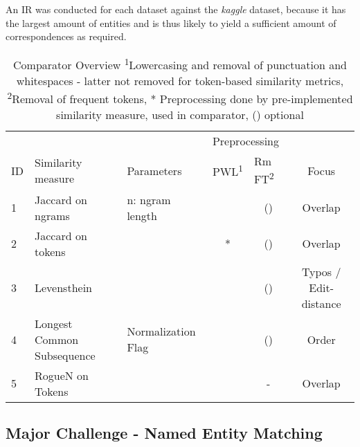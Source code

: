 \documentclass[11pt,titlepage,oneside,openany]{book}
\begin{document}
An IR was conducted for each dataset against the \textit{kaggle} dataset, because it has the largest amount of entities and is thus likely to yield a sufficient amount of correspondences as required.


\begin{table}[b]
	
	
	\begin{tabular}{lllccc}
		& \multicolumn{2}{l}{}                              & \multicolumn{2}{l}{Preprocessing}                   & \\
		ID & Similarity   measure       & Parameters           & \multicolumn{1}{l}{PWL\textsuperscript{1}} & \multicolumn{1}{l}{Rm FT\textsuperscript{2}} & Focus\\
		1  & Jaccard on ngrams          & n: ngram   length    & \checked & (\checked)                     & Overlap\\
		2  & Jaccard on tokens          &                      & *                       & (\checked)                       &Overlap\\
		3  & Levensthein                &                      & \checked & (\checked)                       &Typos / Edit-distance\\
		4  & Longest Common Subsequence & Normalization   Flag & \checked & (\checked)                       & Order\\
		5  & RogueN on Tokens \cite{lin_rouge_2004} & & \checked & -  & Overlap                      
	\end{tabular}

\caption[Comparator Overview]%
{Comparator Overview \small\medspace\medspace \textsuperscript{1}Lowercasing and removal of punctuation and whitespaces -  latter not removed for token-based similarity metrics, \textsuperscript{2}Removal of frequent tokens, * Preprocessing done by pre-implemented similarity measure, \checked \space used in comparator, (\checked) optional}
\label{table:comparators}

\end{table}

\subsection{Major Challenge - Named Entity Matching}
\end{document}
